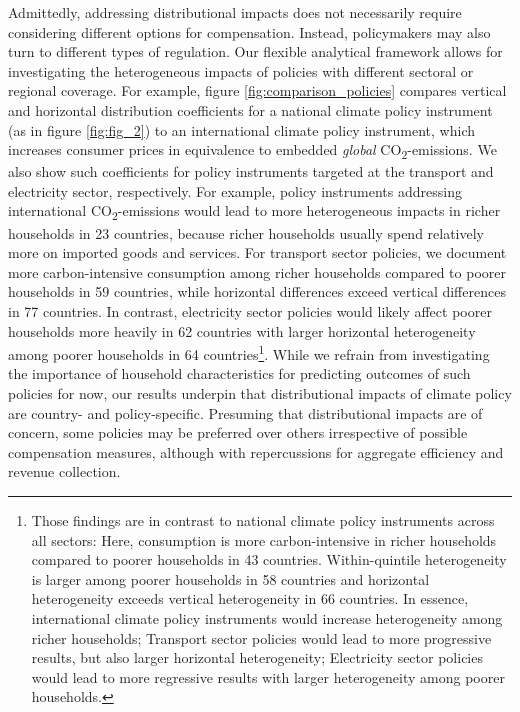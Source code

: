 \documentclass[12pt, a4paper]{article}
\begin{document}
Admittedly, addressing distributional impacts does not necessarily require considering different options for compensation. Instead, policymakers may also turn to different types of regulation. Our flexible analytical framework allows for investigating the heterogeneous impacts of policies with different sectoral or regional coverage. For example, figure \ref{fig:comparison_policies} compares vertical and horizontal distribution coefficients for a national climate policy instrument (as in figure \ref{fig:fig_2}) to an international climate policy instrument, which increases consumer prices in equivalence to embedded \textit{global} CO\textsubscript{2}-emissions. We also show such coefficients for policy instruments targeted at the transport and electricity sector, respectively. For example, policy instruments addressing international CO\textsubscript{2}-emissions  \autocite[such as border carbon adjustment, e.g][]{Mehling.2019,Cosbey.2019} would lead to more heterogeneous impacts in richer households in 23 countries, because richer households usually spend relatively more on imported goods and services. For transport sector policies, we document more carbon-intensive consumption among richer households compared to poorer households in 59 countries, while horizontal differences exceed vertical differences in 77 countries. In contrast, electricity sector policies would likely affect poorer households more heavily in 62 countries with larger horizontal heterogeneity among poorer households in 64 countries\footnote{Those findings are in contrast to national climate policy instruments across all sectors: Here, consumption is more carbon-intensive in richer households compared to poorer households in 43 countries. Within-quintile heterogeneity is larger among poorer households in 58 countries and horizontal heterogeneity exceeds vertical heterogeneity in 66 countries. In essence, international climate policy instruments would increase heterogeneity among richer households; Transport sector policies would lead to more progressive results, but also larger horizontal heterogeneity; Electricity sector policies would lead to more regressive results with larger heterogeneity among poorer households.}. While we refrain from investigating the importance of household characteristics for predicting outcomes of such policies for now, our results underpin that distributional impacts of climate policy are country- and policy-specific. Presuming that distributional impacts are of concern, some policies may be preferred over others irrespective of possible compensation measures, although with repercussions for aggregate efficiency and revenue collection. 
\end{document}
